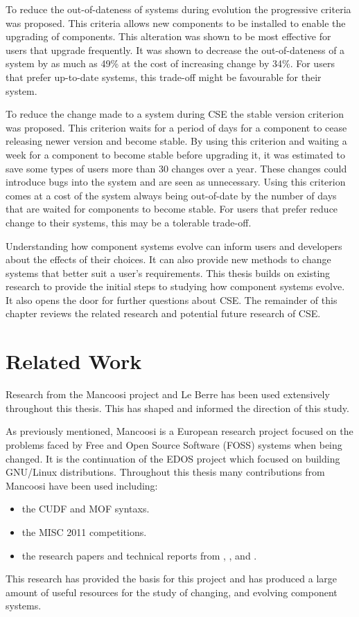 To reduce the out-of-dateness of systems during evolution the progressive criteria was proposed.
This criteria allows new components to be installed to enable the upgrading of components.
This alteration was shown to be most effective for users that upgrade frequently.
It was shown to decrease the out-of-dateness of a system by as much as 49\% at the cost of increasing change by 34\%.
For users that prefer up-to-date systems, this trade-off might be favourable for their system.

To reduce the change made to a system during CSE the stable version criterion was proposed.
This criterion waits for a period of days for a component to cease releasing newer version and become stable.
By using this criterion and waiting a week for a component to become stable before upgrading it, it was estimated to save some types of users more than 30 changes over a year.
These changes could introduce bugs into the system and are seen as unnecessary. 
Using this criterion comes at a cost of the system always being out-of-date by the number of days that are waited for components to become stable.
For users that prefer reduce change to their systems, this may be a tolerable trade-off.

Understanding how component systems evolve can inform users and developers about the effects of their choices.
It can also provide new methods to change systems that better suit a user's requirements.
This thesis builds on existing research to provide the initial steps to studying how component systems evolve.
It also opens the door for further questions about CSE.
The remainder of this chapter reviews the related research and potential future research of CSE.  

\section{Related Work}
Research from the Mancoosi project and Le Berre has been used extensively throughout this thesis.
This has shaped and informed the direction of this study.

As previously mentioned,
Mancoosi is a European research project focused on the problems faced by Free and Open Source Software (FOSS) systems when being changed.
It is the continuation of the EDOS project which focused on building GNU/Linux distributions.
Throughout this thesis many contributions from Mancoosi have been used including:
\begin{itemize}
  \item the CUDF \citep{treinen2009common} and MOF syntaxs.
  \item the MISC 2011 competitions.
  \item the research papers and technical reports from \cite{abatetrenen2010}, \cite{Treinen2009}, \cite{argelich2010solving} and \cite{abate2011}.
\end{itemize} 
This research has provided the basis for this project and has produced a large amount of useful resources for the study of changing, and evolving component systems. 

